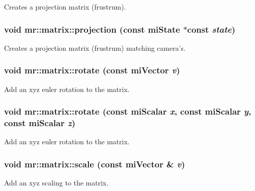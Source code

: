 Creates a projection matrix (frustrum). 

\subsubsection{\setlength{\rightskip}{0pt plus 5cm}void mr::matrix::projection (const mi\-State $\ast$const {\em state})\hspace{0.3cm}{\tt  [inline]}}\label{classmr_1_1matrix_z23_14}


Creates a projection matrix (frustrum) matching camera's. 

\subsubsection{\setlength{\rightskip}{0pt plus 5cm}void mr::matrix::rotate (const mi\-Vector {\em v})\hspace{0.3cm}{\tt  [inline]}}\label{classmr_1_1matrix_z23_19}


Add an xyz euler rotation to the matrix. 

\subsubsection{\setlength{\rightskip}{0pt plus 5cm}void mr::matrix::rotate (const mi\-Scalar {\em x}, const mi\-Scalar {\em y}, const mi\-Scalar {\em z})\hspace{0.3cm}{\tt  [inline]}}\label{classmr_1_1matrix_z23_18}


Add an xyz euler rotation to the matrix. 

\subsubsection{\setlength{\rightskip}{0pt plus 5cm}void mr::matrix::scale (const mi\-Vector \& {\em v})\hspace{0.3cm}{\tt  [inline]}}\label{classmr_1_1matrix_z23_22}


Add an xyz scaling to the matrix. 

